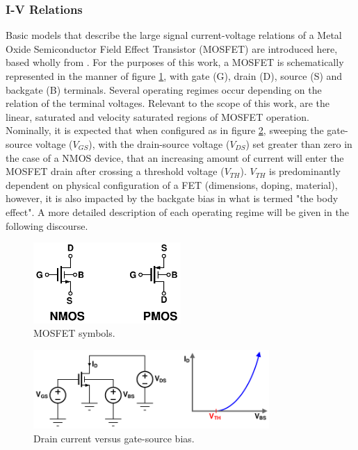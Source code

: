 	\subsubsection{I-V Relations}\label{sec:mos_iv}
	Basic models that describe the large signal current-voltage relations of a Metal Oxide Semiconductor Field Effect Transistor (MOSFET) are introduced here, based wholly from \cite{razavi_2017}. For the purposes of this work, a MOSFET is schematically represented in the manner of figure \ref{fig:mos_symbols}, with gate (G), drain (D), source (S) and backgate (B) terminals. Several operating regimes occur depending on the relation of the terminal voltages. Relevant to the scope of this work, are the linear, saturated and velocity saturated regions of MOSFET operation. Nominally, it is expected that when configured as in figure \ref{fig:vgs_sweep}, sweeping the gate-source voltage ($V_{GS}$), with the drain-source voltage ($V_{DS}$) set greater than zero in the case of a NMOS device, that an increasing amount of current will enter the MOSFET drain after crossing a threshold voltage ($V_{TH}$). $V_{TH}$ is predominantly dependent on physical configuration of a FET (dimensions, doping, material), however, it is also impacted by the backgate bias in what is termed "the body effect". A more detailed description of each operating regime will be given in the following discourse.

			\begin{figure}[htb!]
			        \centering
			        \includegraphics[width=0.5\textwidth, angle=0]{./figs/theory/fet_symbols}
			    \caption{MOSFET symbols.}
			    \label{fig:mos_symbols}
			\end{figure}

			\begin{figure}[htb!]
			        \centering
			        \includegraphics[width=0.8\textwidth, angle=0]{./figs/theory/vgs_sweep}
			    \caption{Drain current versus gate-source bias.}
			    \label{fig:vgs_sweep}
			\end{figure}


